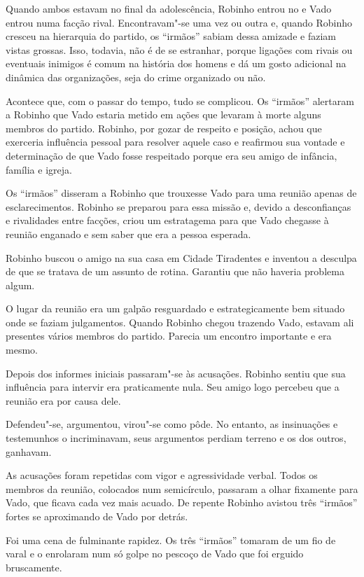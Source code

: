 Quando ambos estavam no final da adolescência, Robinho entrou no  e
Vado entrou numa facção rival. Encontravam"-se uma vez ou outra e,
quando Robinho cresceu na hierarquia do partido, os ``irmãos'' sabiam
dessa amizade e faziam vistas grossas. Isso, todavia, não é de se
estranhar, porque ligações com rivais ou eventuais inimigos é comum na
história dos homens e dá um gosto adicional na dinâmica das
organizações, seja do crime organizado ou não.

Acontece que, com o passar do tempo, tudo se complicou. Os ``irmãos''
alertaram a Robinho que Vado estaria metido em ações que levaram à
morte alguns membros do partido. Robinho, por gozar de respeito e
posição, achou que exerceria influência pessoal para resolver aquele
caso e reafirmou sua vontade e determinação de que Vado fosse
respeitado porque era seu amigo de infância, família e igreja.

Os ``irmãos'' disseram a Robinho que trouxesse Vado para uma reunião
apenas de esclarecimentos. Robinho se preparou para essa missão e,
devido a desconfianças e rivalidades entre facções, criou um estratagema
para que Vado chegasse à reunião enganado e sem saber que era a pessoa
esperada.

Robinho buscou o amigo na sua casa em Cidade Tiradentes e inventou a
desculpa de que se tratava de um assunto de rotina. Garantiu que não
haveria problema algum.

\asterisc{}

O lugar da reunião era um galpão resguardado e estrategicamente bem
situado onde se faziam julgamentos. Quando Robinho chegou trazendo
Vado, estavam ali presentes vários membros do partido. Parecia um
encontro importante e era mesmo.

Depois dos informes iniciais passaram"-se às acusações. Robinho sentiu
que sua influência para intervir era praticamente nula. Seu amigo logo
percebeu que a reunião era por causa dele.

Defendeu"-se, argumentou, virou"-se como pôde. No entanto, as insinuações
e testemunhos o incriminavam, seus argumentos perdiam terreno e os dos
outros, ganhavam.

As acusações foram repetidas com vigor e agressividade verbal. Todos os
membros da reunião, colocados num semicírculo, passaram a olhar
fixamente para Vado, que ficava cada vez mais acuado. De repente
Robinho avistou três ``irmãos'' fortes se aproximando de Vado por
detrás.

Foi uma cena de fulminante rapidez. Os três ``irmãos'' tomaram de um fio
de varal e o enrolaram num só golpe no pescoço de Vado que foi erguido
bruscamente.

